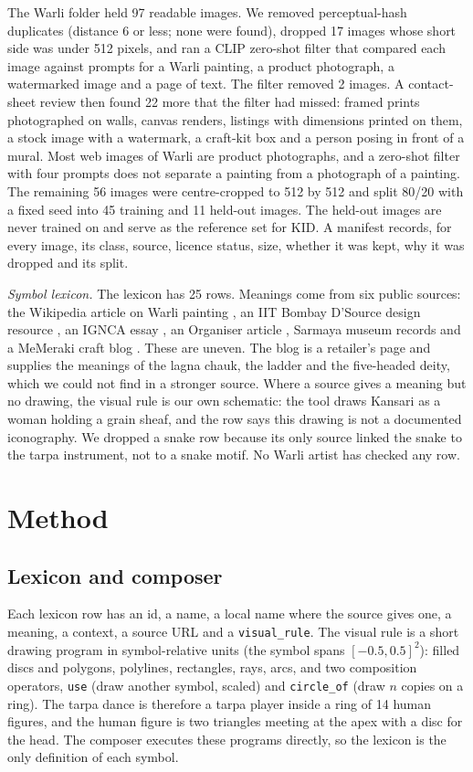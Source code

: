 \documentclass[conference]{IEEEtran}
\begin{document}
The Warli folder held 97 readable images. We removed perceptual-hash duplicates (distance 6 or less; none were found), dropped 17 images whose short side was under 512 pixels, and ran a CLIP zero-shot filter that compared each image against prompts for a Warli painting, a product photograph, a watermarked image and a page of text. The filter removed 2 images. A contact-sheet review then found 22 more that the filter had missed: framed prints photographed on walls, canvas renders, listings with dimensions printed on them, a stock image with a watermark, a craft-kit box and a person posing in front of a mural. Most web images of Warli are product photographs, and a zero-shot filter with four prompts does not separate a painting from a photograph of a painting. The remaining 56 images were centre-cropped to 512 by 512 and split 80/20 with a fixed seed into 45 training and 11 held-out images. The held-out images are never trained on and serve as the reference set for KID. A manifest records, for every image, its class, source, licence status, size, whether it was kept, why it was dropped and its split.

\textit{Symbol lexicon.} The lexicon has 25 rows. Meanings come from six public sources: the Wikipedia article on Warli painting \cite{wiki_warli}, an IIT Bombay D'Source design resource \cite{dsource_warli}, an IGNCA essay \cite{ignca_warli}, an Organiser article \cite{organiser_warli}, Sarmaya museum records \cite{sarmaya_kansari} and a MeMeraki craft blog \cite{memeraki_warli}. These are uneven. The blog is a retailer's page and supplies the meanings of the lagna chauk, the ladder and the five-headed deity, which we could not find in a stronger source. Where a source gives a meaning but no drawing, the visual rule is our own schematic: the tool draws Kansari as a woman holding a grain sheaf, and the row says this drawing is not a documented iconography. We dropped a snake row because its only source linked the snake to the tarpa instrument, not to a snake motif. No Warli artist has checked any row.


\section{Method}

\subsection{Lexicon and composer}

Each lexicon row has an id, a name, a local name where the source gives one, a meaning, a context, a source URL and a \texttt{visual\_rule}. The visual rule is a short drawing program in symbol-relative units (the symbol spans $[-0.5, 0.5]^2$): filled discs and polygons, polylines, rectangles, rays, arcs, and two composition operators, \texttt{use} (draw another symbol, scaled) and \texttt{circle\_of} (draw $n$ copies on a ring). The tarpa dance is therefore a tarpa player inside a ring of 14 human figures, and the human figure is two triangles meeting at the apex with a disc for the head. The composer executes these programs directly, so the lexicon is the only definition of each symbol.
\end{document}
